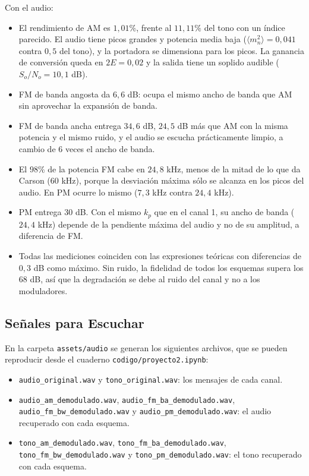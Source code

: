 \documentclass[11pt,a4paper]{article}
\numberwithin{equation}{section}
\begin{document}
Con el audio:
\begin{itemize}
  \item El rendimiento de AM es $1,01\%$, frente al $11,11\%$ del tono con un índice parecido. El audio tiene picos grandes y potencia media baja ($\langle m_n^2\rangle =0,041$ contra $0,5$ del tono), y la portadora se dimensiona para los picos. La ganancia de conversión queda en $2E=0,02$ y la salida tiene un soplido audible ($S_o/N_o=10,1$ dB).
  \item FM de banda angosta da $6,6$ dB: ocupa el mismo ancho de banda que AM sin aprovechar la expansión de banda.
  \item FM de banda ancha entrega $34,6$ dB, $24,5$ dB más que AM con la misma potencia y el mismo ruido, y el audio se escucha prácticamente limpio, a cambio de $6$ veces el ancho de banda.
  \item El $98\%$ de la potencia FM cabe en $24,8$ kHz, menos de la mitad de lo que da Carson ($60$ kHz), porque la desviación máxima sólo se alcanza en los picos del audio. En PM ocurre lo mismo ($7,3$ kHz contra $24,4$ kHz).
  \item PM entrega $30$ dB. Con el mismo $k_p$ que en el canal 1, su ancho de banda ($24,4$ kHz) depende de la pendiente máxima del audio y no de su amplitud, a diferencia de FM.
  \item Todas las mediciones coinciden con las expresiones teóricas con diferencias de $0,3$ dB como máximo. Sin ruido, la fidelidad de todos los esquemas supera los $68$ dB, así que la degradación se debe al ruido del canal y no a los moduladores.
\end{itemize}

\subsection{Señales para Escuchar}
En la carpeta \texttt{assets/audio} se generan los siguientes archivos, que se pueden reproducir desde el cuaderno \texttt{codigo/proyecto2.ipynb}:
\begin{itemize}
  \item \texttt{audio\_original.wav} y \texttt{tono\_original.wav}: los mensajes de cada canal.
  \item \texttt{audio\_am\_demodulado.wav}, \texttt{audio\_fm\_ba\_demodulado.wav},\\ \texttt{audio\_fm\_bw\_demodulado.wav} y \texttt{audio\_pm\_demodulado.wav}: el audio recuperado con cada esquema.
  \item \texttt{tono\_am\_demodulado.wav}, \texttt{tono\_fm\_ba\_demodulado.wav},\\ \texttt{tono\_fm\_bw\_demodulado.wav} y \texttt{tono\_pm\_demodulado.wav}: el tono recuperado con cada esquema.
\end{itemize}
\end{document}
